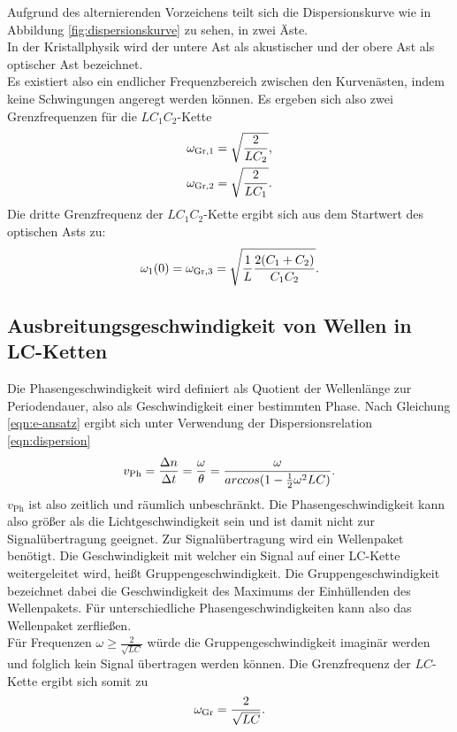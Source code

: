 Aufgrund des alternierenden Vorzeichens teilt sich die Dispersionskurve wie in Abbildung \ref{fig:dispersionskurve} zu sehen, in zwei Äste. \\
In der Kristallphysik wird der untere Ast als akustischer und der obere Ast als optischer Ast bezeichnet.\\
Es existiert also ein endlicher Frequenzbereich zwischen den Kurvenästen, indem keine Schwingungen angeregt werden können.
Es ergeben sich also zwei Grenzfrequenzen für die $LC_{\mathrm{1}}C_{\mathrm{2}}$-Kette
\begin{equation}
	\centering
	\label{eqn:wgrenz_lc1c2}
	\begin{gathered}
		\omega_{\mathrm{Gr,1}}=\sqrt{\frac{2}{LC_{\mathrm{2}}}} \text{,}\\
		\omega_{\mathrm{Gr,2}}=\sqrt{\frac{2}{LC_{\mathrm{1}}}} \text{.}
	\end{gathered}
\end{equation}
Die dritte Grenzfrequenz der $LC_{\mathrm{1}}C_{\mathrm{2}}$-Kette ergibt sich aus dem Startwert des optischen Asts zu:
\begin{equation}
	\centering
	\label{eqn:wgrenz_lc1c2-3}
	\omega_{1}(0)=\omega_{\mathrm{Gr,3}}=\sqrt{\frac{1}{L}\frac{2(C_1+C_2)}{C_1C_2}}.
\end{equation}
\FloatBarrier

\subsection{Ausbreitungsgeschwindigkeit von Wellen in LC-Ketten}
Die Phasengeschwindigkeit wird definiert als Quotient der Wellenlänge zur Periodendauer, also als Geschwindigkeit einer bestimmten Phase.
Nach Gleichung \eqref{eqn:e-ansatz} ergibt sich unter Verwendung der Dispersionsrelation  \eqref{eqn:dispersion}
\begin{equation}
	\centering
	\label{eqn:v-phase}
	v_{\mathrm{Ph}}=\frac{ \Delta n}{ \Delta t}=\frac{\omega}{\theta}=\frac{\omega}{arccos(1-\frac{1}{2}\omega^2LC)}.
\end{equation}
$v_{\mathrm{Ph}}$ ist also zeitlich und räumlich unbeschränkt. Die Phasengeschwindigkeit kann also größer als die Lichtgeschwindigkeit sein und ist damit nicht zur Signalübertragung geeignet.
Zur Signalübertragung wird ein Wellenpaket benötigt.
Die Geschwindigkeit mit welcher ein Signal auf einer LC-Kette weitergeleitet wird, heißt Gruppengeschwindigkeit.
Die Gruppengeschwindigkeit bezeichnet dabei die Geschwindigkeit des Maximums der Einhüllenden des Wellenpakets.
Für unterschiedliche Phasengeschwindigkeiten kann also das Wellenpaket zerfließen.\\
Für Frequenzen $\omega\geq\frac{2}{\sqrt{LC}}$ würde die Gruppengeschwindigkeit imaginär werden und folglich kein Signal übertragen werden können.
Die Grenzfrequenz der $LC$-Kette ergibt sich somit zu
\begin{equation}
	\centering
	\label{eqn:wgrenz_lc}
	\omega_{\mathrm{Gr}}=\frac{2}{\sqrt{LC}}.
\end{equation}
\FloatBarrier

